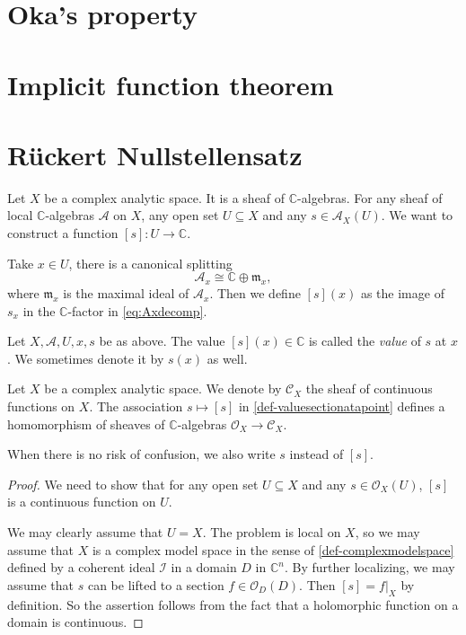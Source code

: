 \section{Oka's property}

\section{Implicit function theorem}

\section{Rückert Nullstellensatz}

Let $X$ be a complex analytic space. It is a sheaf of $\mathbb{C}$-algebras.
For any sheaf of local $\mathbb{C}$-algebras $\mathcal{A}$ on $X$, any open set $U\subseteq X$ and any $s\in \mathcal{A}_X(U)$. We want to construct a function $[s]:U\rightarrow \mathbb{C}$.

Take $x\in U$, there is a canonical splitting
\begin{equation}\label{eq:Axdecomp}
  \mathcal{A}_{x}\cong \mathbb{C}\oplus \mathfrak{m}_{x}, 
\end{equation}
where $\mathfrak{m}_x$ is the maximal ideal of $\mathcal{A}_{x}$. Then we define $[s](x)$ as the image of $s_x$ in the $\mathbb{C}$-factor in \eqref{eq:Axdecomp}.

\begin{definition}\label{def-valuesectionatapoint}
    Let $X,\mathcal{A},U,x,s$ be as above. The value $[s](x)\in \mathbb{C}$ is called the \emph{value} of $s$ at $x$. We sometimes denote it by $s(x)$ as well.
\end{definition}

\begin{lemma}
    Let $X$ be a complex analytic space. We denote by $\mathcal{C}_X$ the sheaf of continuous functions on $X$. 
    The association $s\mapsto [s]$ in \cref{def-valuesectionatapoint} defines a homomorphism of sheaves of $\mathbb{C}$-algebras $\mathcal{O}_X\rightarrow \mathcal{C}_X$. 
\end{lemma}
When there is no risk of confusion, we also write $s$ instead of $[s]$.
\begin{proof}
    We need to show that for any open set $U\subseteq X$ and any $s\in \mathcal{O}_X(U)$, $[s]$ is a continuous function on $U$. 
    
    We may clearly assume that $U=X$. The problem is local on $X$, so we may assume that $X$ is a complex model space in the sense of \cref{def-complexmodelspace} defined by a coherent ideal $\mathcal{I}$ in a domain $D$ in $\mathbb{C}^n$. By further localizing, we may assume that $s$ can be lifted to a section $f\in\mathcal{O}_D(D)$. Then $[s]=f|_X$ by definition. So the assertion follows from the fact that a holomorphic function on a domain is continuous.
\end{proof}

